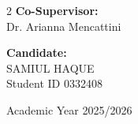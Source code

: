 \begin{titlepage}
\begin{minipage}[t]{1\textwidth}
\begin{multicols}{2}
        {\normalsize{\textbf{Co-Supervisor:}}{\normalsize\vspace{1mm}
        \\ \normalsize{Dr. Arianna Mencattini  }}} \\
        
         \columnbreak
         \columnbreak

         \begin{flushright}
            {\normalsize{\textbf{Candidate:}}{\normalsize\vspace{1mm}
            \\ \normalsize{SAMIUL HAQUE}\\
            \normalsize{Student ID 0332408}}} \\
         \end{flushright}
    \end{multicols}
\end{minipage}

\vspace*{\fill}

\begin{center}
        \normalsize{Academic Year 2025/2026}
\end{center}

\end{titlepage}
